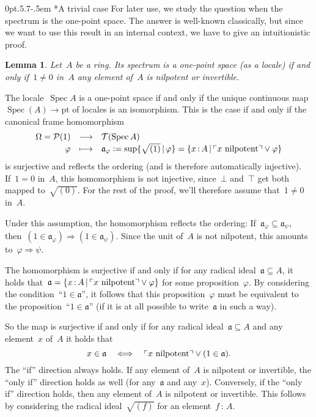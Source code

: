 \documentclass[10pt,reqno,a4paper]{amsbook}
\makeatletter
\theoremstyle{definition}
\theoremstyle{plain}
\newtheorem{lemma}[defn]{Lemma}
\theoremstyle{remark}
\renewcommand{\P}{\mathcal{P}}
\newcommand{\T}{\mathcal{T}}
\newcommand{\aaa}{\mathfrak{a}}
\newcommand{\pt}{\mathrm{pt}}
\DeclareMathOperator{\Spec}{Spec}
\newcommand{\Open}{\T}
\newcommand{\?}{\,{:}\,}
\renewcommand{\_}{\mathpunct{.}\,}
\newcommand{\speak}[1]{\ulcorner\text{\textnormal{#1}}\urcorner}
\newcommand{\defeq}{\vcentcolon=}
\renewenvironment{proof}[1][\proofname]{\par
  \pushQED{\qed}%
  \normalfont \topsep6\p@\@plus6\p@\relax
  \trivlist
  \item[\hskip\labelsep
        \itshape
    #1\@addpunct{.}]\ignorespaces
}{%
  \popQED\endtrivlist\@endpefalse
}
\def\subsection{\@startsection{subsection}{2}%
  {0pt}{.5\linespacing\@plus.7\linespacing}{-.5em}%
  {\normalfont\bfseries}}
\makeatother
\begin{document}
{\subsection*{A trivial case}
For later use, we study the question when the spectrum is the one-point space.
The answer is well-known classically, but since we want to use this result in
an internal context, we have to give an intuitionistic proof.
\begin{lemma}\label{lemma:spectrum-one-point}
Let~$A$ be a ring. Its spectrum is a one-point
space (as a locale) if and only if~$1 \neq 0$ in~$A$ any element of~$A$ is nilpotent or
invertible.\end{lemma}
\begin{proof}The locale~$\Spec A$ is a one-point space if and only if the
unique continuous map~$\Spec(A) \to \pt$ of locales is an isomorphism. This is the case if and only
if the canonical frame homomorphism
\[ \begin{array}{@{}rcl@{}}
  \Omega = \P(1) &\longrightarrow& \Open(\Spec A) \\[0.1em]
  \varphi &\longmapsto& \aaa_\varphi \defeq \sup\{\sqrt{(1)} \,|\, \varphi \} =
  \{ x \? A \,|\, \speak{$x$ nilpotent} \vee \varphi \}
\end{array} \]
is surjective and reflects the ordering (and is therefore automatically
injective). If~$1 = 0$ in~$A$, this homomorphism is not injective, since~$\bot$
and~$\top$ get both mapped to~$\sqrt{(0)}$. For the rest of the proof, we'll
therefore assume that~$1 \neq 0$ in~$A$.

Under this assumption, the homomorphism reflects the ordering: If~$\aaa_\varphi \subseteq \aaa_\psi$,
then~$(1 \in \aaa_\varphi) \Rightarrow (1 \in \aaa_\psi)$. Since the unit
of~$A$ is not nilpotent, this amounts to~$\varphi \Rightarrow \psi$.

The homomorphism is surjective if and only if for any radical ideal~$\aaa \subseteq A$,
it holds that~$\aaa = \{ x \? A \,|\, \speak{$x$ nilpotent} \vee \varphi \}$
for some proposition~$\varphi$. By considering the condition~``$1 \in \aaa$'',
it follows that this proposition~$\varphi$ must be equivalent to the
proposition~``$1 \in \aaa$'' (if it is at all possible to write~$\aaa$ in such
a way).

So the map is surjective if and only if for any radical ideal~$\aaa \subseteq
A$ and any element~$x$ of~$A$ it holds that
\[ x \in \aaa \quad\Longleftrightarrow\quad
  \speak{$x$ nilpotent} \vee (1 \in \aaa). \]
The ``if'' direction always holds. If any element of~$A$ is nilpotent or
invertible, the ``only if'' direction holds as well (for any~$\aaa$ and any~$x$).
Conversely, if the ``only if'' direction holds, then any element of~$A$ is
nilpotent or invertible. This follows by
considering the radical ideal~$\sqrt{(f)}$ for an element~$f \? A$.
\end{proof}

}
\end{document}
